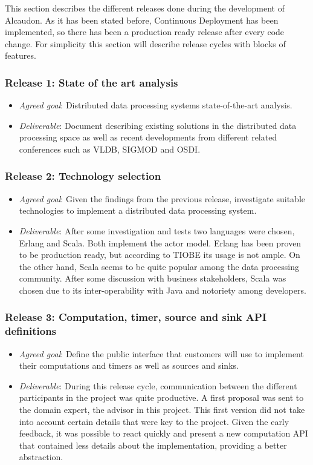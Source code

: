 This section describes the different releases done during the development of
Alcaudon. As it has been stated before, Continuous Deployment has been
implemented, so there has been a production ready release after every code
change. For simplicity this section will describe release cycles with blocks of
features.

\subsubsection{Release 1: State of the art analysis}
\begin{itemize}
\item \textit{Agreed goal}: Distributed data processing systems state-of-the-art analysis.
  \item \textit{Deliverable}: Document describing existing solutions in the
    distributed data processing space as well as recent developments from
    different related conferences such as VLDB, SIGMOD and OSDI.
\end{itemize}

\subsubsection{Release 2: Technology selection}
\begin{itemize}
\item \textit{Agreed goal}: Given the findings from the previous release,
  investigate suitable technologies to implement a distributed data processing
  system.
\item \textit{Deliverable}: After some investigation and tests two languages
  were chosen, Erlang and Scala. Both implement the actor model. Erlang has been
  proven to be production ready, but according to TIOBE\cite{tiobe} its usage is
  not ample. On the other hand, Scala seems to be quite popular among the data
  processing community. After some discussion with business stakeholders, Scala
  was chosen due to its inter-operability with Java and notoriety among
  developers.
\end{itemize}

\subsubsection{Release 3: Computation, timer, source and sink API definitions}
\begin{itemize}
\item \textit{Agreed goal}: Define the public interface that customers will use
  to implement their computations and timers as well as sources and sinks.
\item \textit{Deliverable}: During this release cycle, communication between the
  different participants in the project was quite productive. A first proposal
  was sent to the domain expert, the advisor in this project. This first version
  did not take into account certain details that were key to the project. Given
  the early feedback, it was possible to react quickly and present a new
  computation API that contained less details about the implementation,
  providing a better abstraction.
\end{itemize}

